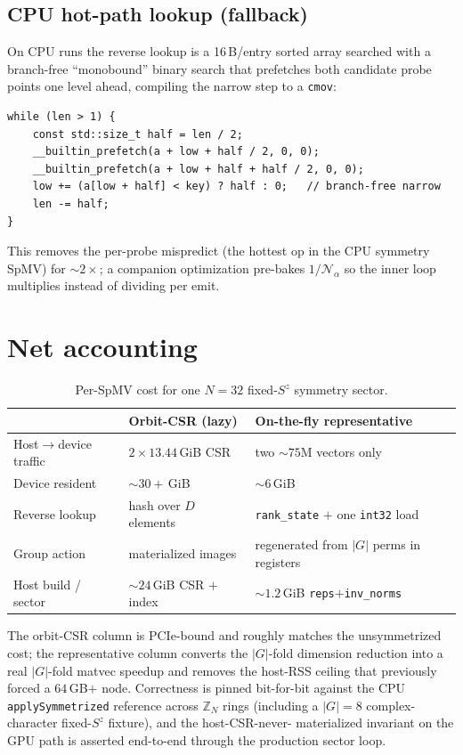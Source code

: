 \documentclass[11pt]{article}
\newcommand{\Norm}{\mathcal{N}}
\newcommand{\reps}{\texttt{reps}}
\newcommand{\code}[1]{\texttt{\small #1}}
\begin{document}
\subsection{CPU hot-path lookup (fallback)}

On CPU runs the reverse lookup is a 16\,B/entry sorted array searched with a
branch-free ``monobound'' binary search that prefetches both candidate probe
points one level ahead, compiling the narrow step to a \code{cmov}:
\begin{lstlisting}[caption={\code{SortedUint64Index::find}.
\code{include/ed/core/sorted\_uint64\_index.h}}]
while (len > 1) {
    const std::size_t half = len / 2;
    __builtin_prefetch(a + low + half / 2, 0, 0);
    __builtin_prefetch(a + low + half + half / 2, 0, 0);
    low += (a[low + half] < key) ? half : 0;   // branch-free narrow
    len -= half;
}
\end{lstlisting}
This removes the per-probe mispredict (the hottest op in the CPU symmetry SpMV)
for ${\sim}2\times$; a companion optimization pre-bakes $1/\Norm_\alpha$ so the
inner loop multiplies instead of dividing per emit.

\section{Net accounting}

\begin{table}[h]
\centering
\caption{Per-SpMV cost for one $N{=}32$ fixed-$S^z$ symmetry sector.}
\begin{tabular}{@{}lll@{}}
\toprule
 & Orbit-CSR (lazy) & On-the-fly representative \\
\midrule
Host$\rightarrow$device traffic & $2\times 13.44$\,GiB CSR & two ${\sim}75$M vectors only \\
Device resident                 & ${\sim}30{+}$\,GiB       & ${\sim}6$\,GiB \\
Reverse lookup                  & hash over $D$ elements   & \code{rank\_state} $+$ one \code{int32} load \\
Group action                    & materialized images      & regenerated from $|G|$ perms in registers \\
Host build / sector             & ${\sim}24$\,GiB CSR $+$ index & ${\sim}1.2$\,GiB \reps{}$+$\code{inv\_norms} \\
\bottomrule
\end{tabular}
\end{table}

The orbit-CSR column is PCIe-bound and roughly matches the unsymmetrized cost;
the representative column converts the $|G|$-fold dimension reduction into a real
$|G|$-fold matvec speedup and removes the host-RSS ceiling that previously forced
a $64$\,GB$+$ node. Correctness is pinned bit-for-bit against the CPU
\code{applySymmetrized} reference across $\mathbb{Z}_N$ rings (including a
$|G|{=}8$ complex-character fixed-$S^z$ fixture), and the host-CSR-never-%
materialized invariant on the GPU path is asserted end-to-end through the
production sector loop.
\end{document}
